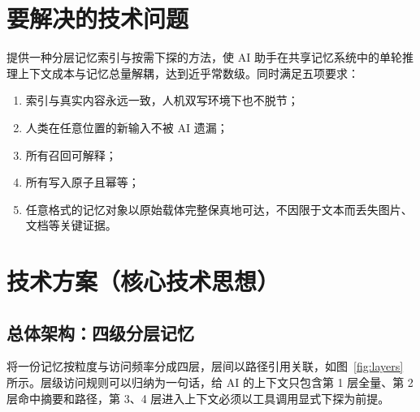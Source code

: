 \documentclass[12pt,a4paper]{article}
\begin{document}
\section{要解决的技术问题}
提供一种分层记忆索引与按需下探的方法，使 AI 助手在共享记忆系统中的单轮推理上下文成本与记忆总量解耦，达到近乎常数级。同时满足五项要求：
\begin{enumerate}[leftmargin=2em,itemsep=2pt]
\item 索引与真实内容永远一致，人机双写环境下也不脱节；
\item 人类在任意位置的新输入不被 AI 遗漏；
\item 所有召回可解释；
\item 所有写入原子且幂等；
\item 任意格式的记忆对象以原始载体完整保真地可达，不因限于文本而丢失图片、文档等关键证据。
\end{enumerate}

\section{技术方案（核心技术思想）}
\subsection{总体架构：四级分层记忆}
将一份记忆按粒度与访问频率分成四层，层间以路径引用关联，如图~\ref{fig:layers} 所示。层级访问规则可以归纳为一句话，给 AI 的上下文只包含第 1 层全量、第 2 层命中摘要和路径，第 3、4 层进入上下文必须以工具调用显式下探为前提。
\end{document}
